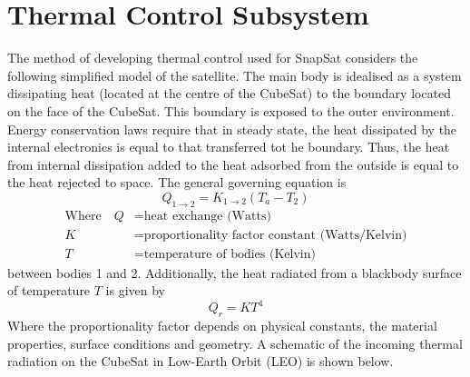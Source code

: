 \section{Thermal Control Subsystem}
The method of developing thermal control used for SnapSat considers the following simplified model of the satellite. The main body is idealised as a system dissipating heat (located at the centre of the CubeSat) to the boundary located on the face of the CubeSat. This boundary is exposed to the outer environment. Energy conservation laws require that in steady state, the heat dissipated by the internal electronics is equal to that transferred tot he boundary. Thus, the heat from internal dissipation added to the heat adsorbed from the outside is equal to the heat rejected to space. The general governing equation is
\begin{equation}
    Q_{1\rightarrow2} = K_{1\rightarrow2}(T_a - T_2)
    \label{eqn:Qconduction}
\end{equation}  
\noindent
\begin{align}
    \text{Where}\quad Q &= \text{heat exchange (Watts)} \nonumber\\
    K &= \text{proportionality factor constant (Watts/Kelvin)} \nonumber\\
    T &= \text{temperature of bodies (Kelvin)} \nonumber
\end{align}
\noindent
between bodies 1 and 2. Additionally, the heat radiated from a blackbody surface of temperature $T$ is given by 
\begin{equation}
    Q_r = KT^4
    \label{eqn:Qradiation}
\end{equation} 
\noindent
Where the proportionality factor depends on physical constants, the material properties, surface conditions and geometry. A schematic of the incoming thermal radiation on the CubeSat in Low-Earth Orbit (LEO) is shown below.
\begin{figure}[H]
    \label{fig:incomingradiation}
\end{figure}

